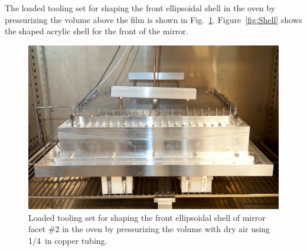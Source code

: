 The loaded tooling set for shaping the front ellipsoidal shell in the oven by pressurizing the volume above the film is
shown in  Fig.~\ref{fig:Pres_Shaping_Front}. Figure~\ref{fig:Shell} shows the shaped acrylic shell for the front of
the mirror.


\begin{figure}[ht]
    \centering
    \includegraphics[width=0.95\linewidth]{images/Pres_Shaping_Front.png}
    \caption{Loaded tooling set for shaping the front ellipsoidal shell of mirror facet \#2 in the oven by pressurizing
      the volume with dry air using 1/4~in copper tubing.}
    \label{fig:Pres_Shaping_Front}
\end{figure}

